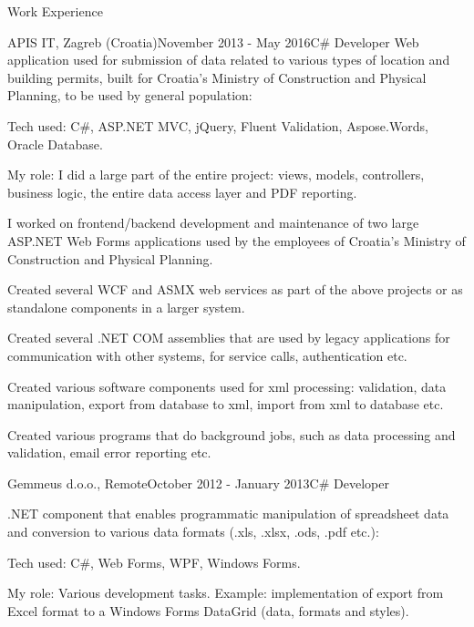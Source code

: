 \documentclass{resume}
\begin{document}
\begin{rSection}{Work Experience}
\begin{rSubsection}{APIS IT, Zagreb (Croatia)}{November 2013 - May 2016}{C\# Developer}{}
Web application used for submission of data related to various types of location and building permits, built for Croatia’s Ministry of Construction and Physical Planning, to be used by general population:

\begin{rList}
\item Tech used: C\#, ASP.NET MVC, jQuery, Fluent Validation, Aspose.Words, Oracle Database.
\item My role: I did a large part of the entire project: views, models, controllers, business logic, the entire data access layer and PDF reporting.
\end{rList}

I worked on frontend/backend development and maintenance of two large ASP.NET Web Forms applications used by the employees of Croatia’s Ministry of Construction and Physical Planning.

Created several WCF and ASMX web services as part of the above projects or as standalone components in a larger system.

Created several .NET COM assemblies that are used by legacy applications for communication with other systems, for service calls, authentication etc.

Created various software components used for xml processing: validation, data manipulation, export from database to xml, import from xml to database etc.

Created various programs that do background jobs, such as data processing and validation, email error reporting etc.

\end{rSubsection}

\vspace{2.0em}

\begin{rSubsection}{Gemmeus d.o.o., Remote}{October 2012 - January 2013}{C\# Developer}{}

.NET component that enables programmatic manipulation of spreadsheet data and conversion to various data formats (.xls, .xlsx, .ods, .pdf etc.):

\begin{rList}
\item Tech used: C\#, Web Forms, WPF, Windows Forms.
\item My role: Various development tasks. Example: implementation of export from Excel format to a Windows Forms DataGrid (data, formats and styles).
\end{rList}


\end{rSubsection}
\end{rSection}
\end{document}
